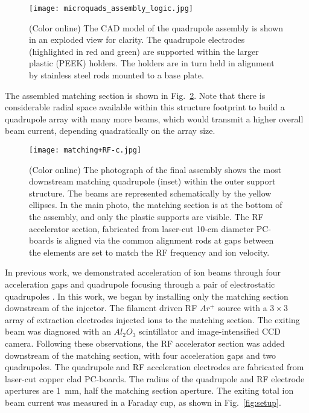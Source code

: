 \documentclass[%
 aip,
rsi,%
 amsmath,amssymb,
 reprint,%
]{revtex4-1}
\begin{document}
\begin{figure}[ht!]
  \centering
  \texttt{[image: microquads\_assembly\_logic.jpg]}
  \caption{(Color online) The CAD model of the quadrupole assembly is shown in an exploded view for clarity.  The quadrupole electrodes (highlighted in red and green) are supported within the larger plastic (PEEK) holders. The holders are in turn held in alignment by stainless steel rods mounted to a base plate. }
  \label{fig:quad-assembly}
\end{figure}

The assembled matching section is shown in Fig.~\ref{fig:matching-photo}.  Note that there is considerable radial space available within this structure footprint to build a quadrupole array with many more beams, which would transmit a higher overall beam current, depending quadratically on the array size. 

\begin{figure}[ht!]
  \centering
  \texttt{[image: matching+RF-c.jpg]}
  \caption{(Color online) The photograph of the final assembly shows the most downstream matching quadrupole (inset) within the outer support structure. The beams are represented schematically by the yellow ellipses. In the main photo, the matching section is at the bottom of the assembly, and only the plastic supports are visible.  The RF accelerator section, fabricated from laser-cut 10-cm diameter PC-boards is aligned via the common alignment rods at gaps between the elements are set to match the RF frequency and ion velocity.}
  \label{fig:matching-photo}
\end{figure}

In previous work\cite{Persaud}, we demonstrated acceleration of ion beams through four acceleration gaps and quadrupole focusing through a pair of electrostatic quadrupoles \cite{Persaud2}.   In this work, we began by installing only the matching section downstream of the injector.  The filament driven RF $Ar^+$ source with a $3\times3$ array of extraction electrodes injected ions to the matching section\cite{Ji2016}.  The exiting beam was diagnosed with an $Al_2O_3$ scintillator and image-intensified CCD camera.  Following these observations, the RF accelerator section was added downstream of the matching section, with four acceleration gaps and two quadrupoles.  The quadrupole and RF acceleration electrodes are fabricated from laser-cut copper clad PC-boards.  The radius of the quadrupole and RF electrode apertures are 1~mm, half the matching section aperture.  The exiting total ion beam current was measured in a Faraday cup, as shown in Fig.~\ref{fig:setup}.  
\end{document}
